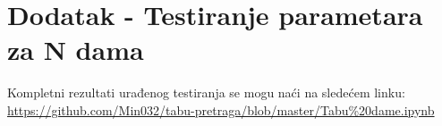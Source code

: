 \documentclass[a4paper]{article}
\begin{document}
\appendix
{}



\appendix
\section{Dodatak - Testiranje parametara za N dama}
\label{appendix:a}
Kompletni rezultati urađenog testiranja se mogu naći na sledećem linku: \href{https://github.com/Min032/tabu-pretraga/blob/master/Tabu\%20dame.ipynb}{https://github.com/Min032/tabu-pretraga/blob/master/Tabu\%20dame.ipynb}
\end{document}
